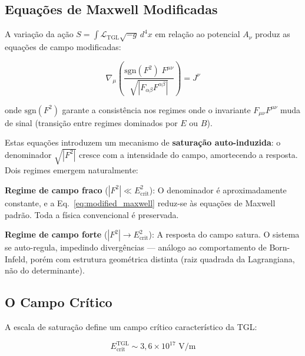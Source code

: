 \documentclass[12pt,a4paper,twoside]{article}
\newcommand{\Ltgl}{\mathcal{L}_{\text{TGL}}}
\newcommand{\Ecrit}{E_{\text{crit}}}
\begin{document}
\subsection{Equa\c{c}\~oes de Maxwell Modificadas}

A varia\c{c}\~ao da a\c{c}\~ao $S = \int \Ltgl \sqrt{-g}\, d^4x$ em rela\c{c}\~ao ao potencial $A_\nu$ produz as equa\c{c}\~oes de campo modificadas:

\begin{equationbox}[title={Maxwell Modificadas / Modified Maxwell Equations}]
\begin{equation}
\nabla_\mu\left(\frac{\text{sgn}(F^2)\; F^{\mu\nu}}{\sqrt{|F_{\alpha\beta}F^{\alpha\beta}|}}\right) = J^\nu
\label{eq:modified_maxwell}
\end{equation}
\end{equationbox}

\noindent onde $\text{sgn}(F^2)$ garante a consist\^encia nos regimes onde o invariante $F_{\mu\nu}F^{\mu\nu}$ muda de sinal (transi\c{c}\~ao entre regimes dominados por $E$ ou $B$).



Estas equa\c{c}\~oes introduzem um mecanismo de \textbf{satura\c{c}\~ao auto-induzida}: o denominador $\sqrt{|F^2|}$ cresce com a intensidade do campo, amortecendo a resposta. Dois regimes emergem naturalmente:

\medskip
\noindent\textbf{Regime de campo fraco} ($|F^2| \ll \Ecrit^2$): O denominador \'e aproximadamente constante, e a Eq.~\eqref{eq:modified_maxwell} reduz-se \`as equa\c{c}\~oes de Maxwell padr\~ao. Toda a f\'isica convencional \'e preservada.

\medskip
\noindent\textbf{Regime de campo forte} ($|F^2| \to \Ecrit^2$): A resposta do campo satura. O sistema se auto-regula, impedindo diverg\^encias --- an\'alogo ao comportamento de Born-Infeld, por\'em com estrutura geom\'etrica distinta (raiz quadrada da Lagrangiana, n\~ao do determinante).

\subsection{O Campo Cr\'itico}

A escala de satura\c{c}\~ao define um campo cr\'itico caracter\'istico da TGL:

\begin{equation}
\Ecrit^{\text{TGL}} \sim 3{,}6 \times 10^{17} \text{ V/m}
\label{eq:ecrit}
\end{equation}
\end{document}
